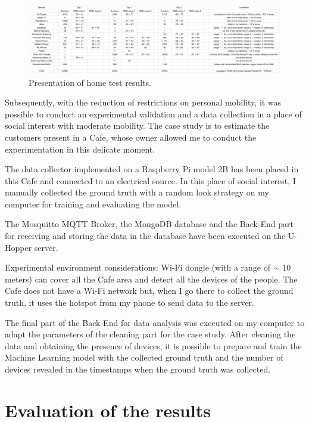 \begin{figure}[h]
\centering 
\includegraphics[width=1\textwidth]{images/sniffertest} 
\caption{Presentation of home test results.}
\label{fig:sniffertest}
\end{figure}

Subsequently, with the reduction of restrictions on personal mobility, it was possible to conduct an experimental validation and a data collection in a place of social interest with moderate mobility. The case study is to estimate the customers present in a Cafe, whose owner allowed me to conduct the experimentation in this delicate moment.

The data collector implemented on a Raspberry Pi model 2B has been placed in this Cafe and connected to an electrical source. In this place of social interest, I manually collected the ground truth with a random look strategy on my computer for training and evaluating the model.

The Mosquitto MQTT Broker, the MongoDB database and the Back-End part for receiving and storing the data in the database have been executed on the U-Hopper server.

Experimental environment considerations: Wi-Fi dongle (with a range of $\sim$ 10 meters) can cover all the Cafe area and detect all the devices of the people. The Cafe does not have a Wi-Fi network but, when I go there to collect the ground truth, it uses the hotspot from my phone to send data to the server.

The final part of the Back-End for data analysis was executed on my computer to adapt the parameters of the cleaning part for the case study. After cleaning the data and obtaining the presence of devices, it is possible to prepare and train the Machine Learning model with the collected ground truth and the number of devices revealed in the timestamps when the ground truth was collected.



\section{Evaluation of the results}
\label{sec:evalres}
\vspace{0.2 cm} 


